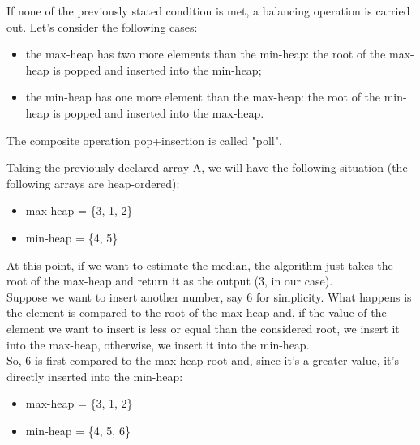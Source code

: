 \documentclass[paper=a4wide, fontsize=12pt]{scrartcl}	 %
\begin{document}
If none of the previously stated condition is met, a balancing operation is carried out.
Let's consider the following cases:
\begin{itemize}
    \item the max-heap has two more elements than the min-heap: the root of the max-heap is popped and inserted into the min-heap; 
    \item the min-heap has one more element than the max-heap: the root of the min-heap is popped and inserted into the max-heap.
\end{itemize} 

The composite operation pop+insertion is called "poll".

Taking the previously-declared array A, we will have the following situation (the following arrays are heap-ordered):
\begin{itemize}
    \item max-heap = \{3, 1, 2\}
    \item min-heap = \{4, 5\} 
\end{itemize}
At this point, if we want to estimate the median, the algorithm just takes the root of the max-heap and return it as the output (3, in our case). \\
Suppose we want to insert another number, say 6 for simplicity. What happens is the element is compared to the root of the max-heap and, if the value of the element we want to insert is less or equal than the considered root, we insert it into the max-heap, otherwise, we insert it into the min-heap. \\
So, 6 is first compared to the max-heap root and, since it's a greater value, it's directly inserted into the min-heap: 
\begin{itemize}
    \item max-heap = \{3, 1, 2\}
    \item min-heap = \{4, 5, 6\} 
\end{itemize}
\end{document}
